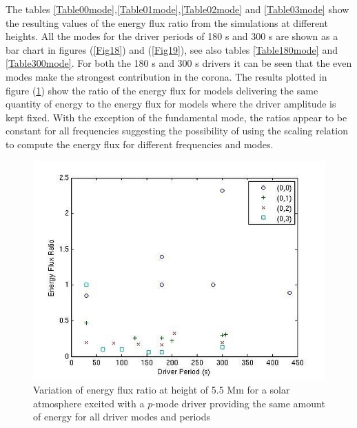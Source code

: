 \documentclass[preprint,authoryear,12pt]{elsarticle}
\begin{document}
The tables \ref{Table00mode},\ref{Table01mode},\ref{Table02mode} and \ref{Table03mode} show the resulting values of the energy flux ratio from the simulations at different heights. All the modes for the driver periods of 180 s and 300 s are shown as a bar chart in figures (\ref{Fig18}) and (\ref{Fig19}), see also tables \ref{Table180mode} and \ref{Table300mode}. For both the 180 s and 300 s drivers it can be seen that the even modes make the strongest contribution in the corona. The results plotted in figure (\ref{Fig20}) show the ratio of the energy flux for models delivering the same quantity of energy to the energy flux for models where the driver amplitude is kept fixed. With the exception of the fundamental mode, the ratios appear to be constant for all frequencies suggesting the possibility of using the scaling relation to compute the energy flux for different frequencies and modes.  
\begin{figure}[h]
\includegraphics[scale=3]{imrescale/ratio_varoverconst_eflux_vperiod_for_modes_5p5Mm.jpg}
\caption{Variation of energy flux ratio at height of 5.5 Mm for a solar atmosphere excited with a $p$-mode driver providing the same amount of energy for all driver modes and periods}
\label{Fig20}
\end{figure}
\end{document}
